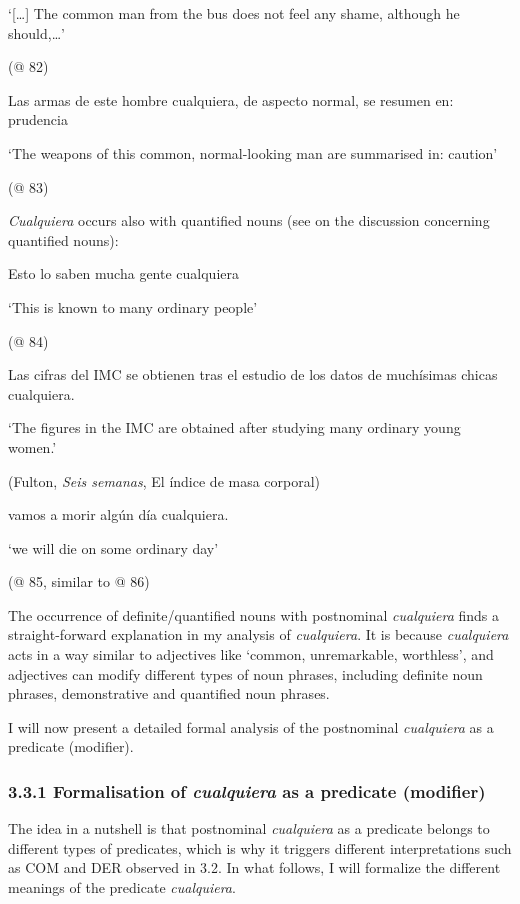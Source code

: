 \documentclass[output=paper]{langscibook}
\begin{document}
  ‘[…] The common man from the bus does not feel any shame, although he should,…’

  (@ 82)

  Las armas de este hombre cualquiera, de aspecto normal, se resumen en: prudencia

  ‘The weapons of this common, normal-looking man are summarised in: caution’

  (@ 83)

\textit{Cualquiera} occurs also with quantified nouns (see  on the discussion concerning quantified nouns):

\label{bkm:Ref58144031}  Esto lo saben mucha gente cualquiera 

  ‘This is known to many ordinary people’

  (@ 84)

\label{bkm:Ref63546096}  Las cifras del IMC se obtienen tras el estudio de los datos de muchísimas chicas cualquiera.

  ‘The figures in the IMC are obtained after studying many ordinary young women.’

  (Fulton, \textit{Seis semanas}, El índice de masa corporal)

  vamos a morir algún día cualquiera. 

  ‘we will die on some ordinary day’

  (@ 85, similar to @ 86)

The occurrence of definite/quantified nouns with postnominal \textit{cualquiera} finds a straight-forward explanation in my analysis of \textit{cualquiera}. It is because \textit{cualquiera} acts in a way similar to adjectives like ‘common, unremarkable, worthless’, and adjectives can modify different types of noun phrases, including definite noun phrases, demonstrative and quantified noun phrases. 

  I will now present a detailed formal analysis of the postnominal \textit{cualquiera} as a predicate (modifier). 

\subsubsection{\textbf{3.3.1} \textbf{Formalisation} \textbf{of} \textbf{\textit{cualquiera}} \textbf{as} \textbf{a} \textbf{predicate} \textbf{(modifier)} }

The idea in a nutshell is that postnominal \textit{cualquiera} as a predicate belongs to different types of predicates, which is why it triggers different interpretations such as COM and DER observed in 3.2. In what follows, I will formalize the different meanings of the predicate \textit{cualquiera}. 
\end{document}
